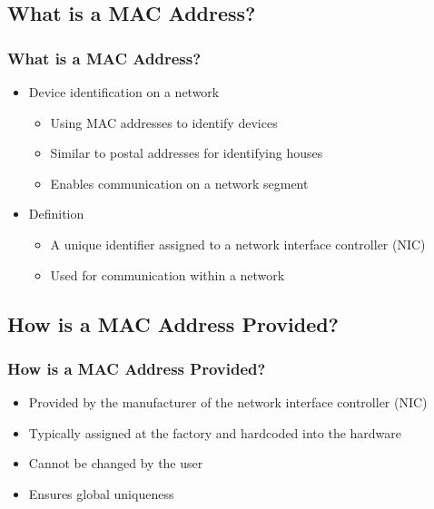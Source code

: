 \documentclass[
english,
svgnames,
notes=hide,
12pt]{beamer}
\begin{document}
\begin{frame}
  \section{What is a MAC Address?}
  \frametitle{What is a MAC Address?}
  \begin{itemize}
    \item Device identification on a network \pause
      \begin{itemize}
        \item Using MAC addresses to identify devices \pause
        \item Similar to postal addresses for identifying houses \pause
        \item Enables communication on a network segment \pause
      \end{itemize}
    \item Definition \pause
      \begin{itemize}
        \item A unique identifier assigned to a network interface controller (NIC) \pause
        \item Used for communication within a network 
      \end{itemize}
  \end{itemize}
\end{frame}

\begin{frame}
  \section{How is a MAC Address Provided?}
  \frametitle{How is a MAC Address Provided?}
  \begin{itemize}
    \item Provided by the manufacturer of the network interface controller (NIC) \pause
    \item Typically assigned at the factory and hardcoded into the hardware \pause
    \item Cannot be changed by the user \pause
    \item Ensures global uniqueness 
  \end{itemize}
\end{frame}
\end{document}

